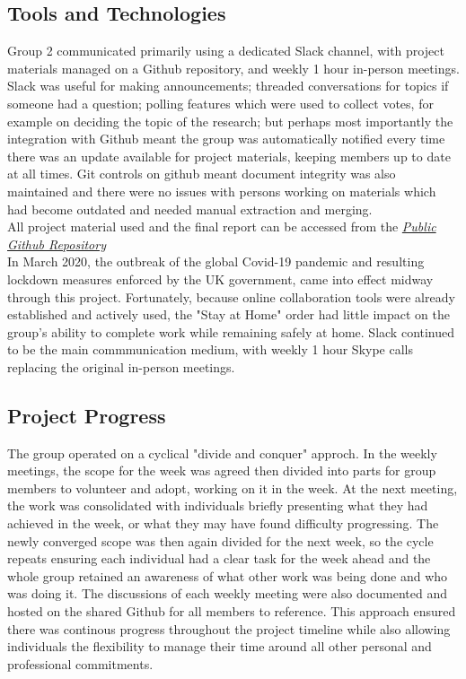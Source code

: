 \documentclass[10pt]{article}\usepackage[]{graphicx}\usepackage[]{color}
\begin{document}
\subsection{Tools and Technologies}
Group 2 communicated primarily using a dedicated Slack channel, with project materials managed on a Github repository, and weekly 1 hour in-person meetings. Slack was useful for making announcements; threaded conversations for topics if someone had a question; polling features which were used to collect votes, for example on deciding the topic of the research; but perhaps most importantly the integration with Github meant the group was automatically notified every time there was an update available for project materials, keeping members up to date at all times. Git controls on github meant document integrity was also maintained and there were no issues with persons working on materials which had become outdated and needed manual extraction and merging.\\

All project material used and the final report can be accessed from the \textit{\href{https://github.com/KarenJewell/CMM507Group2}{Public Github Repository}} \\

In March 2020, the outbreak of the global Covid-19 pandemic and resulting lockdown measures enforced by the UK government, came into effect midway through this project. Fortunately, because online collaboration tools were already established and actively used, the "Stay at Home" order had little impact on the group's ability to complete work while remaining safely at home. Slack continued to be the main commmunication medium, with weekly 1 hour Skype calls replacing the original in-person meetings.\\


\subsection{Project Progress}

The group operated on a cyclical "divide and conquer" approch. In the weekly meetings, the scope for the week was agreed then divided into parts for group members to volunteer and adopt, working on it in the week. At the next meeting, the work was consolidated with individuals briefly presenting what they had achieved in the week, or what they may have found difficulty progressing. The newly converged scope was then again divided for the next week, so the cycle repeats ensuring each individual had a clear task for the week ahead and the whole group retained an awareness of what other work was being done and who was doing it. The discussions of each weekly meeting were also documented and hosted on the shared Github for all members to reference. This approach ensured there was continous progress throughout the project timeline while also allowing individuals the flexibility to manage their time around all other personal and professional commitments. \\
\end{document}
